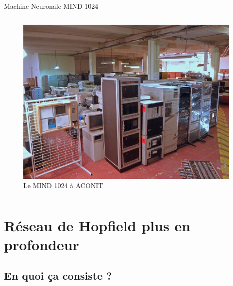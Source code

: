 \documentclass{beamer}
\begin{document}
\begin{frame}{Machine Neuronale MIND 1024}
\begin{columns}[T]
            \begin{figure}
                \centering
                \includegraphics[width=0.6\linewidth]{pic/aconit1.jpeg}
                \caption{Le MIND 1024 à ACONIT}
            \end{figure}
    \end{columns}
\end{frame}

\section{Réseau de Hopfield plus en profondeur}

\subsection{En quoi ça consiste ?}
\end{document}
